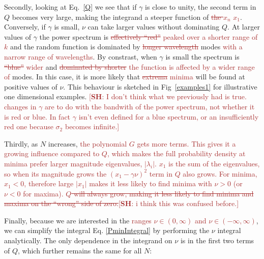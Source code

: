 \documentclass[12pt]{article}
\newcommand{\SH}[1]{\textcolor{brown}{[{\bf SH}: #1]}}
\newcommand{\sh}[1]{\textcolor{brown}{#1}}
\begin{document}
Secondly,  looking at Eq.~\ref{Q} we see that if $\gamma$ is close to unity,  the second term in $Q$ becomes very large, making the integrand a steeper function of \sh{\sout{the $x_n$} $x_1$}. Conversely, if   $\gamma$ is small, $\nu$ can take larger values without dominating $Q$.  At larger values of $\gamma$ the power spectrum is \sh{\sout{effectively ``red''} peaked over a shorter range of $k$} and the random function is dominated by \sh{\sout{longer wavelength}} modes \sh{with a narrow range of wavelengths}. By constrast, when $\gamma$ is small the spectrum is \sh{\sout{``blue''} wider} and \sh{\sout{dominated by shorter} the function is affected by a wider range of} modes. In this case, it is more likely that \sh{\sout{extrema} minima} will be found at positive values of $\nu$. This behaviour is sketched in Fig~\ref{examples1} for illustrative one dimensional examples.   \SH{I don't think what we previously had is true. changes in $\gamma$ are to do with the bandwith of the power spectrum, not whether it is red or blue. In fact $\gamma$ isn't even defined for a blue spectrum, or an insufficiently red one because $\sigma_2$ becomes infinite.}

Thirdly, as $N$ increases, \sh{the polynomial $G$ gets more terms. This gives it a growing influence compared to $Q$, which makes the full probability density at minima prefer larger magnitude eigenvalues, $|\lambda_i|$. $x_1$ is the sum of the eigenvalues, so when its magnitude grows the $(x_1-\gamma \nu)^2$ term in $Q$ also grows. For minima, $x_1<0$, therefore large $|x_1|$ makes it less likely to find minima with $\nu >0$ (or $\nu <0 $ for maxima).} \sh{\sout{$Q$ will always grow, making it less likely to find minima and maxima on the ``wrong'' side of zero.}}\SH{i think this was confused before.}

Finally, because we are interested in the \sh{ranges $\nu \in (0 , \infty)$ and $\nu \in (-\infty , \infty)$}, we can simplify the integral Eq. \ref{PminIntegral} by performing the $\nu$ integral analytically. The only dependence in the integrand on $\nu$ is in the first two terms of $Q$, which further remains the same for all $N$:
\end{document}
